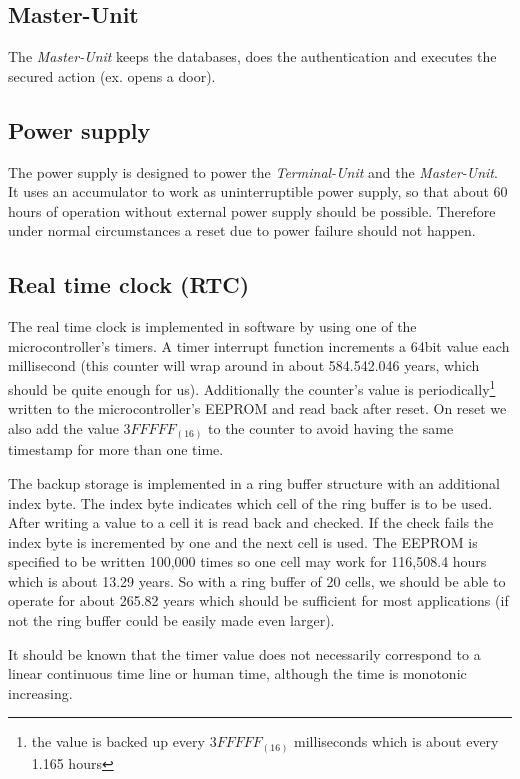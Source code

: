 \subsection{Master-Unit}
The \textit{Master-Unit} keeps the databases, does the authentication and executes the secured action (ex. opens a door).

\subsection{Power supply}
The power supply is designed to power the \textit{Terminal-Unit} and the \textit{Master-Unit}. It uses an accumulator to work as uninterruptible power supply, so that about 60 hours of operation without external power supply should be possible. Therefore under normal circumstances a reset due to power failure should not happen.

\subsection{Real time clock (RTC)}
The real time clock is implemented in software by using one of the microcontroller's timers. A timer interrupt function increments a 64bit value each millisecond (this counter will wrap around in about 584.542.046 years, which should be quite enough for us). Additionally the counter's value is periodically\footnote{the value is backed up every $3FFFFF_{(16)}$ milliseconds which is about every 1.165 hours} written to the microcontroller's EEPROM and read back after reset. On reset we also add the value $3FFFFF_{(16)}$ to the counter to avoid having the same timestamp for more than one time.

The backup storage is implemented in a ring buffer structure with an additional index byte. 
The index byte indicates which cell of the ring buffer is to be used. After writing a value to a cell it is read back and checked. If the check fails the index byte is incremented by one and the next cell is used. The EEPROM is specified to be written 100,000 times so one cell may work for 116,508.4 hours which is about 13.29 years. So with a ring buffer of 20 cells, we should be able to operate for about 265.82 years which should be sufficient for most applications (if not the ring buffer could be easily made even larger).

It should be known that the timer value does not necessarily correspond to a linear continuous time line or human time, although the time is monotonic increasing. %

